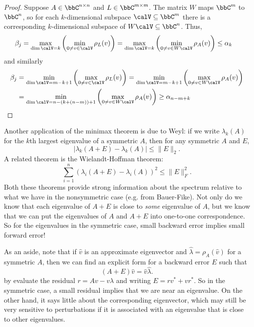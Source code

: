 \documentclass[12pt, leqno]{article} %
\begin{document}
\begin{proof}
  Suppose $A \in \bbC^{n \times n}$ and $L \in \bbC^{m \times m}$.  The matrix
  $W$ maps $\bbC^{m}$ to $\bbC^{n}$, so for each $k$-dimensional subspace
  $\calV \subseteq \bbC^{m}$ there is a corresponding
  $k$-dimensional subspace of $W\calV \subseteq \bbC^{n}$.  Thus,
  \begin{align*}
  \beta_j &=
    \max_{\dim \calV = k} \left( \min_{0 \neq v \in \calV} \rho_L(v) \right)
  = \max_{\dim \calV = k} \left( \min_{0 \neq v \in W\calV} \rho_A(v) \right)
  \leq \alpha_k
  \end{align*}
  and similarly
  \begin{align*}
  \beta_j &=
    \min_{\dim \calV = m-k+1} \left( \max_{0 \neq v \in \calV} \rho_L(v) \right)
  =
    \min_{\dim \calV = m-k+1} \left( \max_{0 \neq v \in W\calV} \rho_A(v) \right) \\
  &=
    \min_{\dim \calV = n-(k+(n-m))+1} \left( \max_{0 \neq v \in W\calV} \rho_A(v) \right)
   \geq \alpha_{n-m+k}
  \end{align*}
\end{proof}

Another application of the minimax theorem is due to Weyl:
if we write $\lambda_k(A)$ for the $k$th largest eigenvalue of
a symmetric $A$, then for any symmetric $A$ and $E$,
\[
  |\lambda_k(A+E)-\lambda_k(A)| \leq \|E\|_2.
\]
A related theorem is the Wielandt-Hoffman theorem:
\[
  \sum_{i=1}^n (\lambda_i(A+E)-\lambda_i(A))^2 \leq \|E\|_F^2.
\]
Both these theorems provide strong information about the spectrum
relative to what we have in the nonsymmetric case (e.g. from
Bauer-Fike).  Not only do we know that each eigenvalue of $A+E$ is
close to {\em some} eigenvalue of $A$, but we know that we can put the
eigenvalues of $A$ and $A+E$ into one-to-one correspondence.  So for
the eigenvalues in the symmetric case, small backward error implies
small forward error!

As an aside, note that if $\hat{v}$ is an approximate eigenvector and
$\hat{\lambda} = \rho_A(\hat{v})$ for a symmetric $A$, then we can
find an explicit form for a backward error $E$ such that
\[
  (A+E)\hat{v} = \hat{v}\hat{\lambda}.
\]
by evaluate the residual $r = Av-v\lambda$ and writing $E = rv^* + vr^*$.
So in the symmetric case, a small residual implies that we are near an
eigenvalue.  On the other hand, it says little about the corresponding
eigenvector, which may still be very sensitive to perturbations if
it is associated with an eigenvalue that is close to other eigenvalues.
\end{document}
